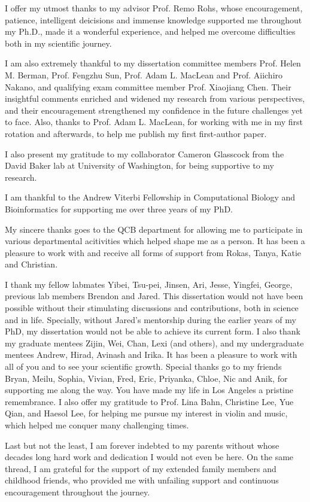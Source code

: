 
I offer my utmost thanks to my advisor Prof. Remo Rohs, whose encouragement, patience, intelligent deicisions and immense knowledge supported me throughout my Ph.D., made it a wonderful experience, and helped me overcome difficulties both in my scientific journey.

I am also extremely thankful to my dissertation committee members Prof. Helen M. Berman, Prof. Fengzhu Sun, Prof. Adam L. MacLean and Prof. Aiichiro Nakano, and qualifying exam committee member Prof. Xiaojiang Chen. Their insightful comments enriched and widened my research from various perspectives, and their encouragement strengthened my confidence in the future challenges yet to face. Also, thanks to Prof. Adam L. MacLean, for working with me in my first rotation and afterwards, to help me publish my first first-author paper.

I also present my gratitude to my collaborator Cameron Glasscock from the David Baker lab at University of Washington, for being supportive to my research. 

I am thankful to the Andrew Viterbi Fellowship in Computational Biology and Bioinformatics for supporting me over three years of my PhD.

My sincere thanks goes to the QCB department for allowing me to participate in various departmental acitivities which helped shape me as a person. It has been a pleasure to work with and receive all forms of support from Rokas, Tanya, Katie and Christian.

I thank my fellow labmates Yibei, Tsu-pei, Jinsen, Ari, Jesse, Yingfei, George, previous lab members Brendon and Jared. This dissertation would not have been possible without their stimulating discussions and contributions, both in science and in life. Specially, without Jared's mentorship during the earlier years of my PhD, my dissertation would not be able to achieve its current form. I also thank my graduate mentees Zijin, Wei, Chan, Lexi (and others), and my undergraduate mentees Andrew, Hirad, Avinash and Irika. It has been a pleasure to work with all of you and to see your scientific growth. 
Special thanks go to my friends Bryan, Meilu, Sophia, Vivian, Fred, Eric, Priyanka, Chloe, Nic and Anik, for supporting me along the way. You have made my life in Los Angeles a pristine remembrance. I also offer my gratitude to Prof. Lina Bahn, Christine Lee, Yue Qian, and Haesol Lee, for helping me pursue my interest in violin and music, which helped me conquer many challenging times.

Last but not the least, I am forever indebted to my parents without whose decades long hard work and dedication I would not even be here. On the same thread, I am grateful for the support of my extended family members and childhood friends, who provided me with unfailing support and continuous encouragement throughout the journey.